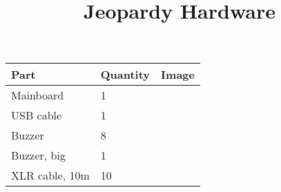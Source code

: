 \documentclass[12pt,a4paper]{scrartcl}
\title{Jeopardy Hardware}
\date{}
\begin{document}
    \maketitle

    \begin{tabularx}{\textwidth}{|X|X|X|}
        \hline
        \textbf{Part} & \textbf{Quantity} & \textbf{Image} \\
        \hline
        Mainboard & 1 & \\
        \hline
        USB cable & 1 & \\
        \hline
        Buzzer & 8 & \\
        \hline
        Buzzer, big & 1 & \\
        \hline
        XLR cable, 10m & 10 & \\
        \hline
    \end{tabularx}
\end{document}
